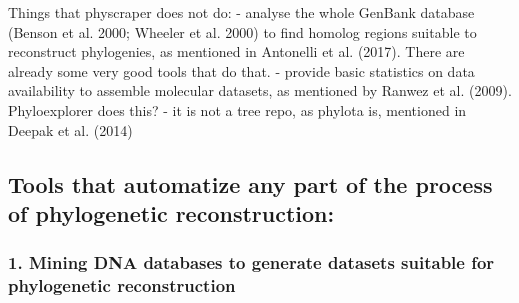 \documentclass[draft]{ametsoc}
\begin{document}
Things that physcraper does not do: - analyse the whole GenBank database
(Benson et al. 2000; Wheeler et al. 2000) to find homolog regions
suitable to reconstruct phylogenies, as mentioned in Antonelli et al.
(2017). There are already some very good tools that do that. - provide
basic statistics on data availability to assemble molecular datasets, as
mentioned by Ranwez et al. (2009). Phyloexplorer does this? - it is not
a tree repo, as phylota is, mentioned in Deepak et al. (2014)

\hypertarget{tools-that-automatize-any-part-of-the-process-of-phylogenetic-reconstruction}{%
\subsection{Tools that automatize any part of the process of
phylogenetic
reconstruction:}\label{tools-that-automatize-any-part-of-the-process-of-phylogenetic-reconstruction}}

\hypertarget{mining-dna-databases-to-generate-datasets-suitable-for-phylogenetic-reconstruction}{%
\subsubsection{1. Mining DNA databases to generate datasets suitable for
phylogenetic
reconstruction}\label{mining-dna-databases-to-generate-datasets-suitable-for-phylogenetic-reconstruction}}
\end{document}
